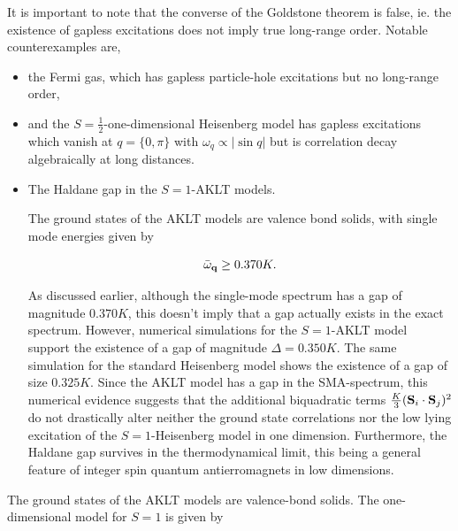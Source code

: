 \documentclass{homework}
\begin{document}
\begin{tcolorbox}[colback = yellow, title = Physical Context]

It is important to note that the converse of the Goldstone theorem is false, ie. the existence of gapless excitations does not imply true long-range order. Notable counterexamples are,

\begin{itemize}
    \item the Fermi gas, which has gapless particle-hole excitations but no long-range order,
    \item and the $S= \frac{1}{2}$-one-dimensional Heisenberg model has gapless excitations which vanish at $q = \{0, \pi\}$ with ${\omega}_{q} \propto |\sin q|$ but is correlation decay algebraically at long distances. 
    \item The Haldane gap in the $S=1$-AKLT models. 
          
          The ground states of the AKLT models are valence bond solids, with single mode energies given by 
          
          $$
              \bar{\omega}_{\bf q} \geq 0.370K.
          $$
          
          As discussed earlier, although the single-mode spectrum has a gap of magnitude $0.370K$, this doesn't imply that a gap actually exists in the exact spectrum. However, numerical simulations for the $S=1$-AKLT model support the existence of a gap of magnitude $\Delta = 0.350K$. The same simulation for the standard Heisenberg model shows the existence of a gap of size $0.325K$. Since the AKLT model has a gap in the SMA-spectrum, this numerical evidence suggests that the additional biquadratic terms $\frac{K}{3} ({\bf S}_i \cdot {\bf S}_j)^2$ do not drastically alter neither the ground state correlations nor the low lying excitation of the $S=1$-Heisenberg model in one dimension. Furthermore, the Haldane gap survives in the thermodynamical limit, this being a general feature of integer spin quantum antierromagnets in low dimensions. 
\end{itemize}

\end{tcolorbox}

\clearpage

\iffalse

The ground states of the AKLT models are valence-bond solids. The one-dimensional model for $S = 1$ is given by 
\end{document}
